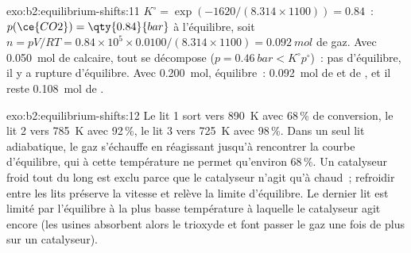 \begin{solution}{exo:b2:equilibrium-shifts:11}
$K^\circ = \exp(-1620/(8.314 \times 1100)) = 0.84$~: $p(\ce{CO2}) =
\qty{0.84}{bar}$ à l'équilibre, soit $n = pV/RT = 0.84 \times 10^5 \times
0.0100/(8.314 \times 1100) = \qty{0.092}{mol}$ de gaz. Avec \qty{0.050}{mol}
de calcaire, tout se décompose ($p = \qty{0.46}{bar} < K^\circ p^\circ$)~:
pas d'équilibre, il y a rupture d'équilibre. Avec \qty{0.200}{mol}, équilibre~:
\qty{0.092}{mol} de  et de , et il reste \qty{0.108}{mol} de .
\end{solution}

\begin{solution}{exo:b2:equilibrium-shifts:12}
Le lit 1 sort vers \qty{890}{K} avec 68\,\% de conversion, le lit 2 vers
\qty{785}{K} avec 92\,\%, le lit 3 vers \qty{725}{K} avec 98\,\%. Dans un seul
lit adiabatique, le gaz s'échauffe en réagissant jusqu'à rencontrer la courbe
d'équilibre, qui à cette température ne permet qu'environ 68\,\%. Un catalyseur froid
tout du long est exclu parce que le catalyseur n'agit qu'à chaud~; refroidir
entre les lits préserve la vitesse et relève la limite d'équilibre. Le dernier lit
est limité par l'équilibre à la plus basse température à laquelle le catalyseur
agit encore (les usines absorbent alors le trioxyde et font passer le gaz une fois de plus sur
un catalyseur).
\end{solution}

